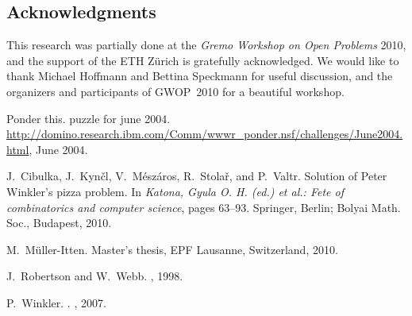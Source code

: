 \documentclass[11pt]{article}
\begin{document}
\subsection*{Acknowledgments}
This research was partially done at the \emph{Gremo Workshop on Open Problems} 2010,
and the support of the ETH Z\"urich is gratefully acknowledged.
We would like to thank Michael Hoffmann and Bettina Speckmann
for useful discussion, and the organizers and participants of GWOP~2010 for a beautiful workshop.






\begin{thebibliography}{1}

Ponder this. puzzle for june 2004.
\newblock
  \url{http://domino.research.ibm.com/Comm/wwwr_ponder.nsf/challenges/June2004.html}, June 2004.

J.~Cibulka, J.~Kyn\v{c}l, V.~M\'{e}sz\'{a}ros, R.~Stola\v{r}, and P.~Valtr.
\newblock Solution of {Peter Winkler's} pizza problem.
\newblock In {\em {Katona, Gyula O. H. (ed.) et al.: Fete of combinatorics and
  computer science}}, pages 63--93. Springer, Berlin; Bolyai Math. Soc.,
  Budapest, 2010.

M.~M{\"{u}}ller-Itten.
\newblock Master's thesis, EPF Lausanne, Switzerland, 2010.

J.~Robertson and W.~Webb.
, 1998.

P.~Winkler.
.
, 2007.

\end{thebibliography}
\end{document}
